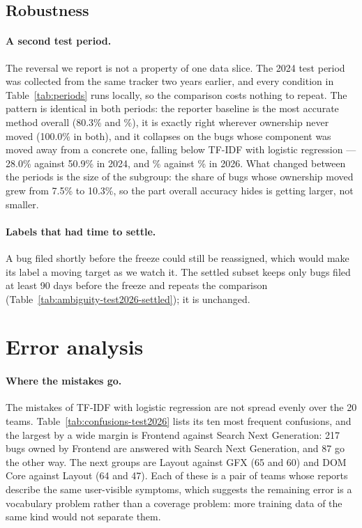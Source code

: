 \documentclass[sigconf,anonymous]{acmart}
\begin{document}
\subsection{Robustness}
\label{sec:robustness}

\paragraph{A second test period.}
The reversal we report is not a property of one data slice. The 2024 test period was collected from
the same tracker two years earlier, and every condition in Table~\ref{tab:periods} runs locally, so
the comparison costs nothing to repeat. The pattern is identical in both periods: the reporter
baseline is the most accurate method overall (80.3\% and \nRepAcc\%), it is exactly right wherever
ownership never moved (100.0\% in both), and it collapses on the bugs whose component was moved away
from a concrete one, falling below TF-IDF with logistic regression --- 28.0\% against 50.9\% in
2024, and \nRepSpecAcc\% against \nLrSpecAcc\% in 2026. What changed between the periods is the size
of the subgroup: the share of bugs whose ownership moved grew from 7.5\% to 10.3\%, so the part
overall accuracy hides is getting larger, not smaller.



\paragraph{Labels that had time to settle.}
A bug filed shortly before the freeze could still be reassigned, which would make its label a moving
target as we watch it. The settled subset keeps only bugs filed at least 90 days before the freeze
and repeats the comparison (Table~\ref{tab:ambiguity-test2026-settled}); it is unchanged.


\section{Error analysis}
\label{sec:errors}


\paragraph{Where the mistakes go.}
The mistakes of TF-IDF with logistic regression are not spread evenly over the 20 teams.
Table~\ref{tab:confusions-test2026} lists its ten most frequent confusions, and the largest by a
wide margin is Frontend against Search Next Generation: 217 bugs owned by Frontend are answered
with Search Next Generation, and 87 go the other way. The next groups are Layout against GFX
(65 and 60) and DOM Core against Layout (64 and 47). Each of these is a pair of teams whose
reports describe the same user-visible symptoms, which suggests the remaining error is a
vocabulary problem rather than a coverage problem: more training data of the same kind would not
separate them.
\end{document}
